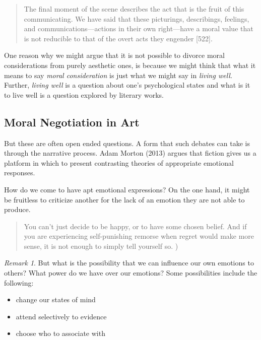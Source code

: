 \documentclass[12pt]{book}
\theoremstyle{definition}
\theoremstyle{remark}
\newtheorem{remark}[theorem]{Remark}
\providecommand{\tightlist}{%
  \setlength{\itemsep}{0pt}\setlength{\parskip}{0pt}}
\begin{document}
\begin{quote}
The final moment of the scene describes the act that is the fruit of this communicating. We have said that these picturings, describings, feelings, and communications---actions in their own right---have a moral value that is not reducible to that of the overt acts they engender {[}522{]}.
\end{quote}

One reason why we might argue that it is not possible to divorce moral considerations from purely aesthetic ones, is because we might think that what it means to say \emph{moral consideration} is just what we might say in \emph{living well}. Further, \emph{living well} is a question about one's psychological states and what is it to live well is a question explored by literary works.

\subsection*{Moral Negotiation in Art}\label{moral-negotiation-in-art}

But these are often open ended questions. A form that such debates can take is through the narrative process. Adam Morton (2013) argues that fiction gives us a platform in which to present contrasting theories of appropriate emotional responses.

How do we come to have apt emotional expressions? On the one hand, it might be fruitless to criticize another for the lack of an emotion they are not able to produce.

\begin{quote}
You can't just decide to be happy, or to have some chosen belief. And if you are experiencing self-punishing remorse when regret would make more sense, it is not enough to simply tell yourself so. )
\end{quote}

\begin{remark}

But what is the possibility that we can influence our own emotions to others? What power do we have over our emotions? Some possibilities include the following:

\begin{itemize}
\tightlist
\item
  change our states of mind
\item
  attend selectively to evidence
\item
  choose who to associate with
\end{itemize}

\end{remark}
\end{document}
